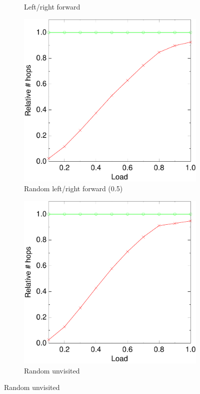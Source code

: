 \documentclass[10pt,a4paper]{article}
\begin{document}
\begin{figure}
\begin{subfigure}[b]{0.5\textwidth}
                \caption{Left/right forward}
        \end{subfigure}

        \vspace*{2em}

        \begin{subfigure}[b]{0.5\textwidth}
                \centering
                \includegraphics[width=\textwidth]{data/4randswitchrandswitch.pdf}
                \caption{Random left/right forward (0.5)}
        \end{subfigure}
        \begin{subfigure}[b]{0.5\textwidth}
                \centering
                \includegraphics[width=\textwidth]{data/4randunvisitedrandunvisited.pdf}
                \caption{Random unvisited}
        \end{subfigure}


\end{figure}
\end{document}
